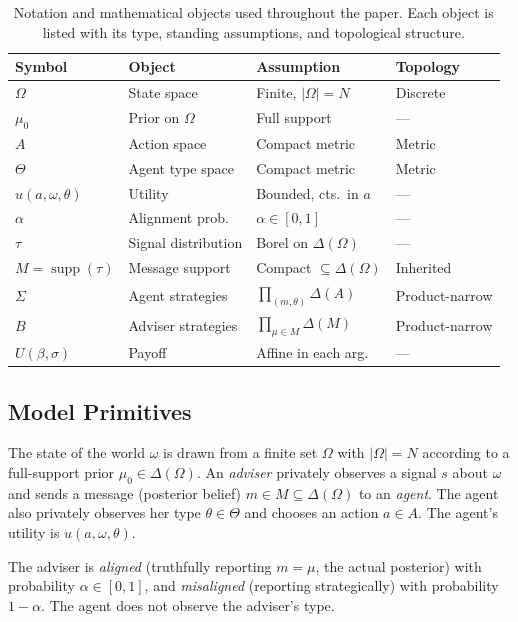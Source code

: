 \documentclass[11pt,a4paper]{article}
\theoremstyle{definition}
\DeclareMathOperator{\supp}{supp}
\newcommand{\DeltaA}{\Delta(A)}
\newcommand{\DeltaO}{\Delta(\Omega)}
\newcommand{\DeltaM}{\Delta(M)}
\begin{document}
\begin{table}[t]
\centering
\caption{Notation and mathematical objects used throughout the paper.
Each object is listed with its type, standing assumptions, and topological structure.}
\label{tab:notation}
\begin{tabular}{@{}llll@{}}
\toprule
\textbf{Symbol} & \textbf{Object} & \textbf{Assumption} & \textbf{Topology} \\
\midrule
$\Omega$ & State space & Finite, $|\Omega|=N$ & Discrete \\
$\mu_0$ & Prior on $\Omega$ & Full support & --- \\
$A$ & Action space & Compact metric & Metric \\
$\Theta$ & Agent type space & Compact metric & Metric \\
$u(a,\omega,\theta)$ & Utility & Bounded, cts.\ in $a$ & --- \\
$\alpha$ & Alignment prob. & $\alpha\in[0,1]$ & --- \\
$\tau$ & Signal distribution & Borel on $\DeltaO$ & --- \\
$M=\supp(\tau)$ & Message support & Compact $\subseteq\DeltaO$ & Inherited \\
$\Sigma$ & Agent strategies & $\prod_{(m,\theta)}\DeltaA$ & Product-narrow \\
$B$ & Adviser strategies & $\prod_{\mu\in M}\DeltaM$ & Product-narrow \\
$U(\beta,\sigma)$ & Payoff & Affine in each arg. & --- \\
\bottomrule
\end{tabular}
\end{table}

\subsection{Model Primitives}

The state of the world $\omega$ is drawn from a finite set $\Omega$ with $|\Omega|=N$ according to a full-support prior $\mu_0\in\DeltaO$.
An \emph{adviser} privately observes a signal $s$ about $\omega$ and sends a message (posterior belief) $m\in M\subseteq\DeltaO$ to an \emph{agent}.
The agent also privately observes her type $\theta\in\Theta$ and chooses an action $a\in A$.
The agent's utility is $u(a,\omega,\theta)$.

The adviser is \emph{aligned} (truthfully reporting $m=\mu$, the actual posterior) with probability $\alpha\in[0,1]$, and \emph{misaligned} (reporting strategically) with probability $1-\alpha$.
The agent does not observe the adviser's type.
\end{document}
